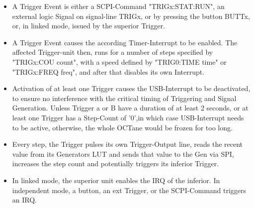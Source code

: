 	{	\begin{itemize}
		\item A Trigger Event is either a SCPI-Command "TRIGx:STAT:RUN", an external logic Signal on signal-line TRIGx, or by pressing the button BUTTx, or, in linked mode, issued by the superior Trigger. 
		\item A Trigger Event causes the according Timer-Interrupt to be enabled. The affected Trigger-unit then, runs for a number of steps specified by "TRIGx:COU count", with a speed defined by "TRIG0:TIME time" or "TRIGx:FREQ freq", and after that disables its own Interrupt. 
		\item Activation of at least one Trigger causes the USB-Interrupt to be deactivated, to ensure no interference with the critical timing of Triggering and Signal Generation. Unless Trigger a or B have a duration of at least 2 seconds, or at least one Trigger has a Step-Count of '0',in which case USB-Interrupt needs to be active, otherwise, the whole OCTane would be frozen for too long. 
		\item Every step, the Trigger pulses its own Trigger-Output line, reads the recent value from its Generators LUT and sends that value to the Gen via SPI, increases the step count and potentially triggers its inferior Trigger. 
		\item In linked mode, the superior unit enables the IRQ of the inferior. In independent mode, a button, an ext Trigger, or the SCPI-Command triggers an IRQ. 
		\end{itemize}
	}

